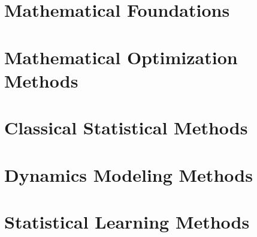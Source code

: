 \documentclass[oneside,hidelinks,12pt,letterpaper]{scrbook} %
\theoremstyle{remark}
\theoremstyle{coloredRemark}
\theoremstyle{coloredNote}
\begin{document}
\newpage

\hypersetup{colorlinks=false}

\newpage

\listofalgorithms
\listoffigures
\listoftables

\dominitoc
\tableofcontents 



\hypersetup{
	colorlinks=true,
	linkcolor=blue}

\mainmatter

\printnomenclature





\part{Mathematical Foundations}




\startcontents[chapters]

\part{Mathematical Optimization Methods}





\startcontents[chapters]
\part{Classical Statistical Methods}





\startcontents[chapters]
\part{Dynamics Modeling Methods}











\startcontents[chapters]
\part{Statistical Learning Methods}




\end{document}
